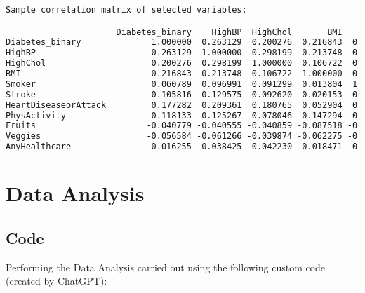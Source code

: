 \documentclass[12pt]{article}
\begin{document}
\begin{lstlisting}[language=TeX]
Sample correlation matrix of selected variables:

                      Diabetes_binary    HighBP  HighChol       BMI    Smoker    Stroke  HeartDiseaseorAttack  PhysActivity    Fruits   Veggies  AnyHealthcare
Diabetes_binary              1.000000  0.263129  0.200276  0.216843  0.060789  0.105816              0.177282     -0.118133 -0.040779 -0.056584       0.016255
HighBP                       0.263129  1.000000  0.298199  0.213748  0.096991  0.129575              0.209361     -0.125267 -0.040555 -0.061266       0.038425
HighChol                     0.200276  0.298199  1.000000  0.106722  0.091299  0.092620              0.180765     -0.078046 -0.040859 -0.039874       0.042230
BMI                          0.216843  0.213748  0.106722  1.000000  0.013804  0.020153              0.052904     -0.147294 -0.087518 -0.062275      -0.018471
Smoker                       0.060789  0.096991  0.091299  0.013804  1.000000  0.061173              0.114441     -0.087401 -0.077666 -0.030678      -0.023251
Stroke                       0.105816  0.129575  0.092620  0.020153  0.061173  1.000000              0.203002     -0.069151 -0.013389 -0.041124       0.008776
HeartDiseaseorAttack         0.177282  0.209361  0.180765  0.052904  0.114441  0.203002              1.000000     -0.087299 -0.019790 -0.039167       0.018734
PhysActivity                -0.118133 -0.125267 -0.078046 -0.147294 -0.087401 -0.069151             -0.087299      1.000000  0.142756  0.153150       0.035505
Fruits                      -0.040779 -0.040555 -0.040859 -0.087518 -0.077666 -0.013389             -0.019790      0.142756  1.000000  0.254342       0.031544
Veggies                     -0.056584 -0.061266 -0.039874 -0.062275 -0.030678 -0.041124             -0.039167      0.153150  0.254342  1.000000       0.029584
AnyHealthcare                0.016255  0.038425  0.042230 -0.018471 -0.023251  0.008776              0.018734      0.035505  0.031544  0.029584       1.000000

\end{lstlisting}

\section{Data Analysis} \subsection{Code}Performing the Data Analysis carried out using the following custom code (created by ChatGPT):
\end{document}
